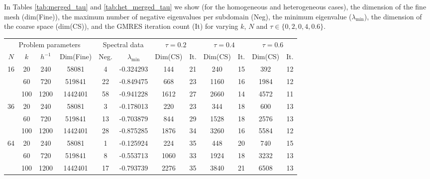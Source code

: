 \documentclass[numbers,webpdf,imaiai]{ima-authoring-template}%
\theoremstyle{thmstyletwo}%
\numberwithin{equation}{section}
\numberwithin{equation}{section}
\begin{document}
{In Tables \ref{tab:merged_tau} and \ref{tab:het_merged_tau} we show (for the homogeneous and heterogeneous cases), 
the dimension of the fine mesh (dim(Fine)), the maximum number of negative eigenvalues per subdomain (Neg), 
the minimum eigenvalue ($\lambda_\text{min}$), the dimension of the coarse space (dim(CS)), 
and the GMRES iteration count (It) for varying $k$, $N$ and $\tau \in\{0,2,0,4,0.6\}$.
\begin{table}[h]
\centering
\scriptsize
\setlength{\tabcolsep}{4pt}
\begin{tabular}{cccc|cc|cc|cc|cc}
\multicolumn{4}{c|}{Problem parameters}
& \multicolumn{2}{c|}{Spectral data}
& \multicolumn{2}{c|}{$\tau=0.2$}
& \multicolumn{2}{c|}{$\tau=0.4$}
& \multicolumn{2}{c}{$\tau=0.6$} \\

$N$ & $k$ & $h^{-1}$ & Dim(Fine)
& Neg. & $\lambda_{\min}$
& Dim(CS) & It.
& Dim(CS) & It.
& Dim(CS) & It. \\
\hline

16 & 20 & 240 & 58081
& 4 & -0.324293
& 144 & 21
& 240 & 15
& 392 & 12 \\

 & 60 & 720 & 519841
& 22 & -0.849475
& 668 & 23
& 1160 & 16
& 1984 & 12 \\

 & 100 & 1200 & 1442401
& 58 & -0.941228
& 1612 & 27
& 2660 & 14
& 4572 & 11 \\

\hline

36 & 20 & 240 & 58081
& 3 & -0.178013
& 220 & 23
& 344 & 18
& 600 & 13 \\

 & 60 & 720 & 519841
& 13 & -0.703879
& 844 & 29
& 1528 & 18
& 2576 & 13 \\

 & 100 & 1200 & 1442401
& 28 & -0.875285
& 1876 & 34
& 3260 & 16
& 5584 & 12 \\

\hline

64 & 20 & 240 & 58081
& 1 & -0.125924
& 224 & 35
& 448 & 20
& 740 & 15 \\

 & 60 & 720 & 519841
& 8 & -0.553713
& 1060 & 33
& 1924 & 18
& 3232 & 13 \\

 & 100 & 1200 & 1442401
& 17 & -0.793739
& 2276 & 35
& 3840 & 21
& 6508 & 13 \\

\hline


\end{tabular}
\end{table}}
\end{document}
